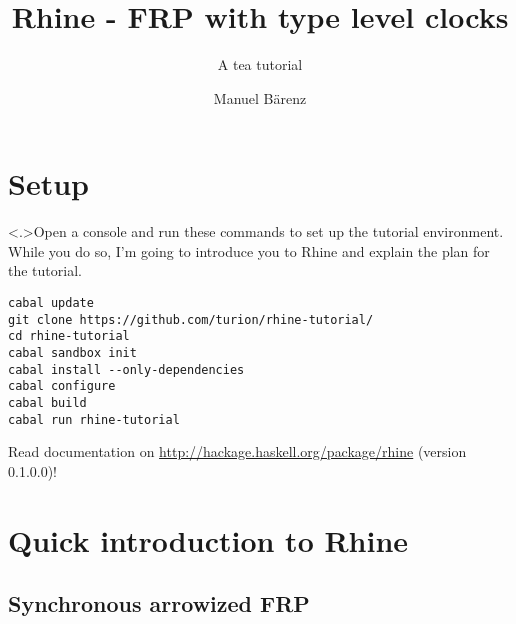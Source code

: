 \documentclass[handout]{enigtex-beamer-base}
\title{Rhine - FRP with type level clocks}
\subtitle{A tea tutorial}
\author{Manuel Bärenz}
\begin{document}
\begin{frame}
\titlepage
\end{frame}

\section{Setup}

\begin{frame}[fragile]
\note<.>{Open a console and run these commands to set up the tutorial environment.
While you do so, I'm going to introduce you to Rhine and explain the plan for the tutorial.}
\begin{verbatim}
cabal update
git clone https://github.com/turion/rhine-tutorial/
cd rhine-tutorial
cabal sandbox init
cabal install --only-dependencies
cabal configure
cabal build
cabal run rhine-tutorial
\end{verbatim}
Read documentation on \href{http://hackage.haskell.org/package/rhine}{http://hackage.haskell.org/package/rhine} (version 0.1.0.0)!
\end{frame}

\section{Quick introduction to Rhine}

\subsection{Synchronous arrowized FRP}
\end{document}

